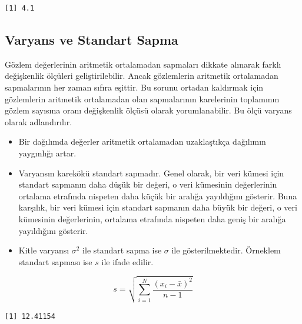 \documentclass[
  letterpaper,
  DIV=11,
  numbers=noendperiod]{scrreprt}
\newenvironment{Shaded}{\begin{snugshade}}{\end{snugshade}}
\newcommand{\AttributeTok}[1]{\textcolor[rgb]{0.40,0.45,0.13}{#1}}
\newcommand{\ConstantTok}[1]{\textcolor[rgb]{0.56,0.35,0.01}{#1}}
\newcommand{\FunctionTok}[1]{\textcolor[rgb]{0.28,0.35,0.67}{#1}}
\newcommand{\NormalTok}[1]{\textcolor[rgb]{0.00,0.23,0.31}{#1}}
\newcommand{\SpecialCharTok}[1]{\textcolor[rgb]{0.37,0.37,0.37}{#1}}
\begin{document}
\begin{verbatim}
[1] 4.1
\end{verbatim}

\hypertarget{varyans-ve-standart-sapma}{%
\subsection*{Varyans ve Standart
Sapma}\label{varyans-ve-standart-sapma}}

Gözlem değerlerinin aritmetik ortalamadan sapmaları dikkate alınarak
farklı değişkenlik ölçüleri geliştirilebilir. Ancak gözlemlerin
aritmetik ortalamadan sapmalarının her zaman sıfıra eşittir. Bu sorunu
ortadan kaldırmak için gözlemlerin aritmetik ortalamadan olan
sapmalarının karelerinin toplamının gözlem sayısına oranı değişkenlik
ölçüsü olarak yorumlanabilir. Bu ölçü varyans olarak adlandırılır.

\begin{itemize}
\item
  Bir dağılımda değerler aritmetik ortalamadan uzaklaştıkça dağılımın
  yaygınlığı artar.
\item
  Varyansın karekökü standart sapmadır. Genel olarak, bir veri kümesi
  için standart sapmanın daha düşük bir değeri, o veri kümesinin
  değerlerinin ortalama etrafında nispeten daha küçük bir aralığa
  yayıldığını gösterir. Buna karşılık, bir veri kümesi için standart
  sapmanın daha büyük bir değeri, o veri kümesinin değerlerinin,
  ortalama etrafında nispeten daha geniş bir aralığa yayıldığını
  gösterir.
\item
  Kitle varyansı \(\sigma^2\) ile standart sapma ise \(\sigma\) ile
  gösterilmektedir. Örneklem standart sapması ise \(s\) ile ifade
  edilir.
\end{itemize}

\[s= \sqrt{\sum_{i=1}^N\frac{(x_i-\bar{x})^2}{n-1}}\]

\begin{Shaded}
\end{Shaded}

\begin{verbatim}
[1] 12.41154
\end{verbatim}

\begin{Shaded}
\end{Shaded}
\end{document}
